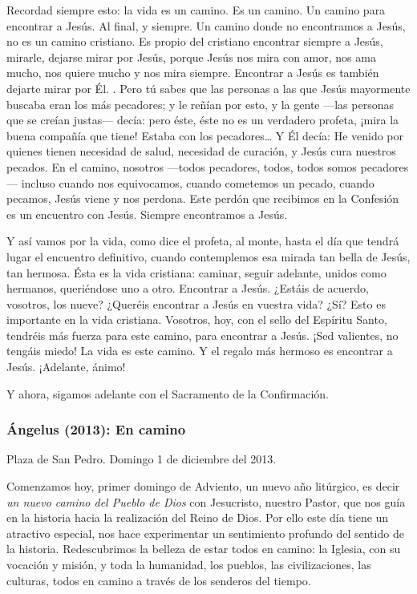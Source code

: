 \begin{body}
Recordad siempre esto: la vida es un camino. Es un camino. Un camino para encontrar a Jesús. Al final, y siempre. Un camino donde no encontramos a Jesús, no es un camino cristiano. Es propio del cristiano encontrar siempre a Jesús, mirarle, dejarse mirar por Jesús, porque Jesús nos mira con amor, nos ama mucho, nos quiere mucho y nos mira siempre. Encontrar a Jesús es también dejarte mirar por Él. . Pero tú sabes que las personas a las que Jesús mayormente buscaba eran los más pecadores; y le reñían por esto, y la gente ---las personas que se creían justas--- decía: pero éste, éste no es un verdadero profeta, ¡mira la buena compañía que tiene! Estaba con los pecadores\ldots{} Y Él decía: He venido por quienes tienen necesidad de salud, necesidad de curación, y Jesús cura nuestros pecados. En el camino, nosotros ---todos pecadores, todos, todos somos pecadores--- incluso cuando nos equivocamos, cuando cometemos un pecado, cuando pecamos, Jesús viene y nos perdona. Este perdón que recibimos en la Confesión es un encuentro con Jesús. Siempre encontramos a Jesús.

Y así vamos por la vida, como dice el profeta, al monte, hasta el día que tendrá lugar el encuentro definitivo, cuando contemplemos esa mirada tan bella de Jesús, tan hermosa. Ésta es la vida cristiana: caminar, seguir adelante, unidos como hermanos, queriéndose uno a otro. Encontrar a Jesús. ¿Estáis de acuerdo, vosotros, los nueve? ¿Queréis encontrar a Jesús en vuestra vida? ¿Sí? Esto es importante en la vida cristiana. Vosotros, hoy, con el sello del Espíritu Santo, tendréis más fuerza para este camino, para encontrar a Jesús. ¡Sed valientes, no tengáis miedo! La vida es este camino. Y el regalo más hermoso es encontrar a Jesús. ¡Adelante, ánimo!

Y ahora, sigamos adelante con el Sacramento de la Confirmación.

\subsubsection{Ángelus (2013): En camino}

Plaza de San Pedro. Domingo 1 de diciembre del 2013.

Comenzamos hoy, primer domingo de Adviento, un nuevo año litúrgico, es decir \emph{un nuevo camino del Pueblo de Dios} con Jesucristo, nuestro Pastor, que nos guía en la historia hacia la realización del Reino de Dios. Por ello este día tiene un atractivo especial, nos hace experimentar un sentimiento profundo del sentido de la historia. Redescubrimos la belleza de estar todos en camino: la Iglesia, con su vocación y misión, y toda la humanidad, los pueblos, las civilizaciones, las culturas, todos en camino a través de los senderos del tiempo.


\end{body}

